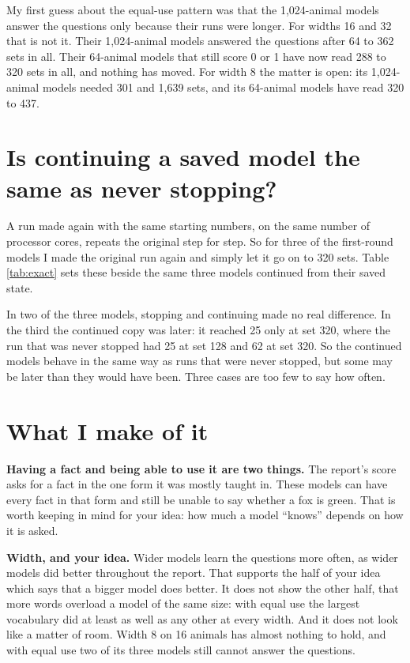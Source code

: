 My first guess about the equal-use pattern was that the 1,024-animal models answer the
questions only because their runs were longer. For widths 16 and 32 that is not it. Their
1,024-animal models answered the questions after 64 to 362 sets in all. Their 64-animal models
that still score 0 or 1 have now read 288 to 320 sets in all, and nothing has moved. For width
8 the matter is open: its 1,024-animal models needed 301 and 1,639 sets, and its 64-animal
models have read 320 to 437.

\section{Is continuing a saved model the same as never stopping?}\label{sec:exact}

A run made again with the same starting numbers, on the same number of processor cores,
repeats the original step for step. So for three of the first-round models I made the original
run again and simply let it go on to 320 sets. Table \ref{tab:exact} sets these beside the same
three models continued from their saved state.

\begin{table}[H]
\centering\small

\caption{Question scores of three models, trained without ever being stopped and continued
from the saved model.}
\label{tab:exact}
\end{table}

In two of the three models, stopping and continuing made no real difference. In the third the
continued copy was later: it reached 25 only at set 320, where the run that was never stopped
had 25 at set 128 and 62 at set 320. So the continued models behave in the same way as runs
that were never stopped, but some may be later than they would have been. Three cases are too
few to say how often.

\section{What I make of it}

\textbf{Having a fact and being able to use it are two things.} The report's score asks for a
fact in the one form it was mostly taught in. These models can have every fact in that form
and still be unable to say whether a fox is green. That is worth keeping in mind for your
idea: how much a model ``knows'' depends on how it is asked.

\textbf{Width, and your idea.} Wider models learn the questions more often, as wider models
did better throughout the report. That supports the half of your idea which says that a bigger
model does better. It does not show the other half, that more words overload a model of the
same size: with equal use the largest vocabulary did at least as well as any other at every
width. And it does not look
like a matter of room. Width 8 on 16 animals has almost nothing to hold, and with equal use
two of its three models still cannot answer the questions.

